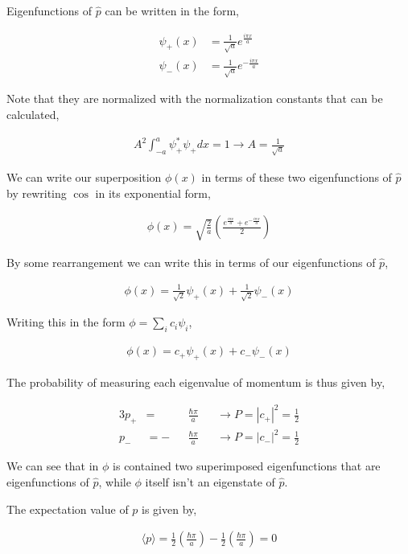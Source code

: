 \documentclass[11pt]{amsart}
\begin{document}
Eigenfunctions of $\hat{p}$ can be written in the form,

\begin{align*}
  \psi_+(x) &= \frac{1}{\sqrt{a}} e^{\frac{i\pi x}{a}} \\
  \psi_-(x) &= \frac{1}{\sqrt{a}} e^{-\frac{i\pi x}{a}}
\end{align*}

Note that they are normalized with the normalization constants that can be calculated,

\begin{align*}
  A^2 \int_{-a}^{a} \psi_+^* \psi_+ dx = 1 \to A = \frac{1}{\sqrt{a}}
\end{align*}

We can write our superposition $\phi(x)$ in terms of these two eigenfunctions of $\hat{p}$ by rewriting $\cos$ in its exponential form,

\begin{align*}
  \phi(x) = \sqrt{\frac{2}{a}} \left(\frac{e^{\frac{i\pi x}{a}} + e^{-\frac{i\pi x}{a}}}{2}\right)
\end{align*}

By some rearrangement we can write this in terms of our eigenfunctions of $\hat{p}$,

\begin{align*}
  \phi(x) = \frac{1}{\sqrt{2}} \psi_+(x) + \frac{1}{\sqrt{2}} \psi_-(x)
\end{align*}

Writing this in the form $\phi = \sum\limits_i c_i \psi_i$,

\begin{align*}
  \phi(x) = c_+ \psi_+(x) + c_- \psi_-(x)
\end{align*}

The probability of measuring each eigenvalue of momentum is thus given by,

\begin{alignat*}{3}
  p_+ &= &&\frac{\hbar\pi}{a}  &&\to P = {|c_+|}^2 = \frac{1}{2} \\
  p_- &= -&&\frac{\hbar\pi}{a} &&\to P = {|c_-|}^2 = \frac{1}{2}
\end{alignat*}

We can see that in $\phi$ is contained two superimposed eigenfunctions that are eigenfunctions of $\hat{p}$, while $\phi$ itself isn't an eigenstate of $\hat{p}$.

The expectation value of $p$ is given by,

\begin{align*}
  \langle p \rangle = \frac{1}{2}\left(\frac{\hbar\pi}{a}\right) - \frac{1}{2}\left(\frac{\hbar\pi}{a}\right) = 0
\end{align*}
\end{document}
